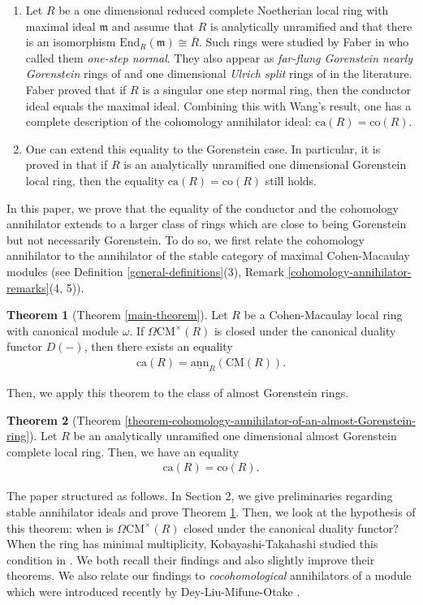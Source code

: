 \documentclass[12pt]{amsart}
\newcommand{\End}{\mathrm{End}}
\newcommand{\sann}{\underline{\mathrm{ann}}}
\newcommand\ca{\mathrm{ca}}
\newcommand\co{\mathrm{co}}
\newcommand{\m}{\mathfrak{m}}
\newcommand{\CM}{\mathrm{CM}}
\theoremstyle{definition}
\newtheorem{introtheorem}{Theorem}
\numberwithin{equation}{theorem}
\begin{document}
\begin{enumerate}
    \item Let $R$ be a one dimensional reduced complete Noetherian local ring with maximal ideal $\m$ and assume that $R$ is analytically unramified and that there is an isomorphism $\End_R(\m) \cong \overline{R}$. Such rings were studied by Faber in \cite{Faber} who called them \textit{one-step normal}. They also appear as \textit{far-flung Gorenstein nearly Gorenstein} rings of \cite{Herzog-Kumashiro-Stamate} and one dimensional \textit{Ulrich split} rings of \cite{Dao-Dey-Dutta} in the literature. Faber proved that if $R$ is a singular one step normal ring, then the conductor ideal equals the maximal ideal. Combining this with Wang's result, one has a complete description of the cohomology annihilator ideal: $\ca(R) = \co(R)$. 
    \item One can extend this equality to the Gorenstein case. In particular, it is proved in \cite[Theorem 5.10]{Esentepe} that if $R$ is an analytically unramified one dimensional Gorenstein local ring, then the equality $\ca(R) = \co(R)$ still holds. 
\end{enumerate}
In this paper, we prove that the equality of the conductor and the cohomology annihilator extends to a larger class of rings which are close to being Gorenstein but not necessarily Gorenstein. To do so, we first relate the cohomology annihilator to the annihilator of the stable category of maximal Cohen-Macaulay modules (see Definition \ref{general-definitions}(3), Remark \ref{cohomology-annihilator-remarks}(4, 5)).
\begin{introtheorem}[Theorem \ref{main-theorem}]\label{introtheorem-a}
 Let $R$ be a Cohen-Macaulay local ring with canonical module $\omega$. If $\Omega \CM^\times(R)$ is closed under the canonical duality functor $D(-)$, then there exists an equality 
    \begin{align*}
    \ca(R) = \sann_R (\CM(R)).
    \end{align*}
\end{introtheorem}
Then, we apply this theorem to the class of almost Gorenstein rings.
\begin{introtheorem}[Theorem \ref{theorem-cohomology-annihilator-of-an-almost-Gorenstein-ring}]\label{introtheorem-b}
     Let $R$ be an analytically unramified one dimensional almost Gorenstein complete local ring. Then, we have an equality 
    \begin{align*}
    \ca(R) = \co(R).
    \end{align*}
\end{introtheorem}
The paper structured as follows. In Section 2, we give preliminaries regarding stable annihilator ideals and prove Theorem \ref{introtheorem-a}. Then, we look at the hypothesis of this theorem: when is $\Omega \CM^\times(R)$ closed under the canonical duality functor? When the ring has minimal multiplicity, Kobayashi-Takahashi studied this condition in \cite{Kobayashi-Takahashi}. We both recall their findings and also slightly improve their theorems. We also relate our findings to \textit{cocohomological} annihilators of a module which were introduced recently by Dey-Liu-Mifune-Otake \cite{Dey-Liu-Mifune-Otake}.
\end{document}
